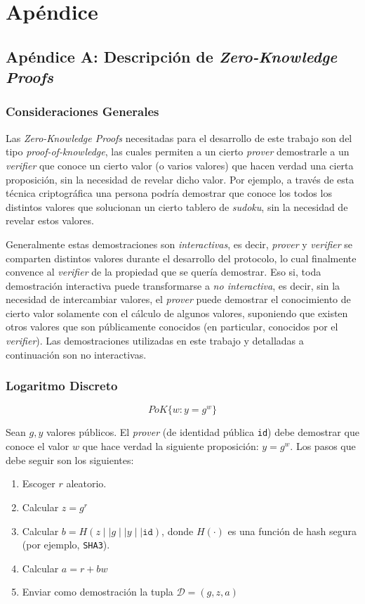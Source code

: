 \chapter{Apéndice}

\section{Apéndice A: Descripción de \emph{Zero-Knowledge Proofs}}\label{apen-a}

\subsection{Consideraciones Generales}

Las \emph{Zero-Knowledge Proofs} necesitadas para el desarrollo de este 
trabajo son del tipo \emph{proof-of-knowledge}, las cuales permiten a un 
cierto \emph{prover} demostrarle a un \emph{verifier} que conoce un cierto 
valor (o varios valores) que hacen verdad una cierta proposición, sin la 
necesidad de revelar dicho valor. Por ejemplo, a través de esta técnica 
criptográfica una persona podría demostrar que conoce los todos los distintos 
valores que solucionan un cierto tablero de \emph{sudoku}, sin la necesidad de 
revelar estos valores.

Generalmente estas demostraciones son \emph{interactivas}, es decir, 
\emph{prover} y \emph{verifier} se comparten distintos valores durante el 
desarrollo del protocolo, lo cual finalmente convence al \emph{verifier} de la 
propiedad que se quería demostrar. Eso si, toda demostración interactiva puede 
transformarse a \emph{no interactiva}, es decir, sin la necesidad de 
intercambiar valores, el \emph{prover} puede demostrar el conocimiento de 
cierto valor solamente con el cálculo de algunos valores, suponiendo que 
existen otros valores que son públicamente conocidos (en particular, conocidos 
por el \emph{verifier}). Las demostraciones utilizadas en este trabajo y 
detalladas a continuación son no interactivas.

\subsection{Logaritmo Discreto}

$$PoK\{w: y = g^w\}$$

Sean $g, y$ valores públicos. El \emph{prover} (de identidad pública 
\texttt{id}) debe demostrar que conoce el valor $w$ que hace verdad la 
siguiente proposición: $y = g^w$. Los pasos que debe seguir son los siguientes:
\begin{enumerate}
	\item Escoger $r$ aleatorio.
	\item Calcular $z = g^r$
	\item Calcular $b = H(z \mid\mid g \mid\mid y \mid\mid \mathtt{id})$, 
	donde $H(\cdot)$ es una función de hash segura (por ejemplo, 
	\texttt{SHA3}).
	\item Calcular $a = r + bw$
	\item Enviar como demostración la tupla $\mathcal{D} = (g, z, a)$
\end{enumerate}

